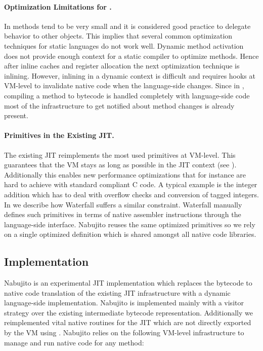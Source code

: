 \paragraph{Optimization Limitations for \PH.}
In \ST methods tend to be very small and it is considered good practice to delegate behavior to other objects.
This implies that several common optimization techniques for static languages do not work well.
Dynamic method activation does not provide enough context for a static compiler to optimize methods.
Hence after inline caches and register allocation the next optimization technique is inlining.
However, inlining in a dynamic context is difficult and requires hooks at VM-level to invalidate native code when the language-side changes.
Since in \PH, compiling a method to bytecode is handled completely with language-side code most of the infrastructure to get notified about method changes is already present.

\paragraph{Primitives in the Existing JIT.}
The existing JIT reimplements the most used primitives at VM-level.
This guarantees that the VM stays as long as possible in the JIT context (see ). Additionally this enables new performance optimizations that for instance are hard to achieve with standard compliant C code.
A typical example is the integer addition which has to deal with overflow checks and conversion of tagged integers.
In  we describe how Waterfall suffers a similar constraint. Waterfall manually defines such primitives in terms of native assembler instructions through the language-side \B interface.
Nabujito reuses the same optimized primitives so we rely on a single optimized definition which is shared amongst all native code libraries.

\subsection{Implementation}
Nabujito is an experimental JIT implementation which replaces the bytecode to native code translation of the existing JIT infrastructure with a dynamic language-side implementation.
Nabujito is implemented mainly with a visitor strategy over the existing intermediate bytecode representation. 
Additionally we reimplemented vital native routines for the JIT which are not directly exported by the VM using \B. 
Nabujito relies on the following VM-level infrastructure to manage and run native code for any \PH method:

